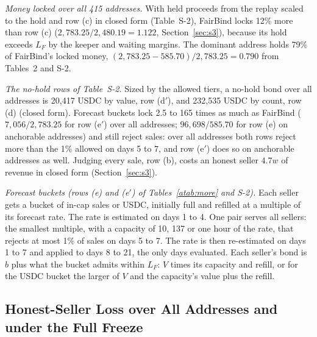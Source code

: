 \documentclass[10pt,a4paper]{article}
\theoremstyle{plain}
\theoremstyle{remark}
\begin{document}
\emph{Money locked over all 415 addresses.} With held proceeds from the replay scaled to the hold and row (c) in closed form (Table~S-2), FairBind locks 12\% more than row (c) ($2{,}783.25/2{,}480.19=1.122$, Section~\ref{sec:s3}), because its hold exceeds $L_F$ by the keeper and waiting margins. The dominant address holds 79\% of FairBind's locked money, $(2{,}783.25-585.70)/2{,}783.25=0.790$ from Tables~2 and S-2.

\emph{The no-hold rows of Table~S-2.} Sized by the allowed tiers, a no-hold bond over all addresses is 20,417 USDC by value, row (d$'$), and 232,535 USDC by count, row (d) (closed form). Forecast buckets lock 2.5 to 165 times as much as FairBind ($7{,}056/2{,}783.25$ for row (e$'$) over all addresses; $96{,}698/585.70$ for row (e) on anchorable addresses) and still reject sales: over all addresses both rows reject more than the 1\% allowed on days 5 to 7, and row (e$'$) does so on anchorable addresses as well. Judging every sale, row (b), costs an honest seller $4.7w$ of revenue in closed form (Section~\ref{sec:s3}).

\emph{Forecast buckets (rows (e) and (e$'$) of Tables~\ref{atab:more} and S-2).} Each seller gets a bucket of in-cap sales or USDC, initially full and refilled at a multiple of its forecast rate. The rate is estimated on days 1 to 4. One pair serves all sellers: the smallest multiple, with a capacity of 10, 137 or one hour of the rate, that rejects at most 1\% of sales on days 5 to 7. The rate is then re-estimated on days 1 to 7 and applied to days 8 to 21, the only days evaluated. Each seller's bond is $b$ plus what the bucket admits within $L_F$: $V$ times its capacity and refill, or for the USDC bucket the larger of $V$ and the capacity's value plus the refill.

\subsection{Honest-Seller Loss over All Addresses and under the Full Freeze}
\label{sec:loss}
\end{document}
